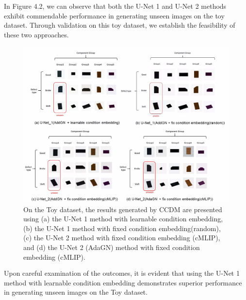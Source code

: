 In Figure 4.2, we can observe that both the U-Net 1 and U-Net 2 methods exhibit commendable performance in generating unseen images on the toy dataset. Through validation on this toy dataset, we establish the feasibility of these two approaches.
\begin{figure}[H]
    \centering
    \includegraphics[width=1\linewidth]{Toy PCB result (2).png}
    \caption{On the Toy dataset, the results generated by CCDM are presented using (a) the U-Net 1 method with learnable condition embedding, (b) the U-Net 1 method with fixed condition embedding(random), (c) the U-Net 2 method with fixed condition embedding (cMLIP), and (d) the U-Net 2 (AdaGN) method with fixed condition embedding (cMLIP).}
    \label{fig:enter-label}
\end{figure}
Upon careful examination of the outcomes, it is evident that using the U-Net 1 method with learnable condition embedding demonstrates superior performance in generating unseen images on the Toy dataset.

